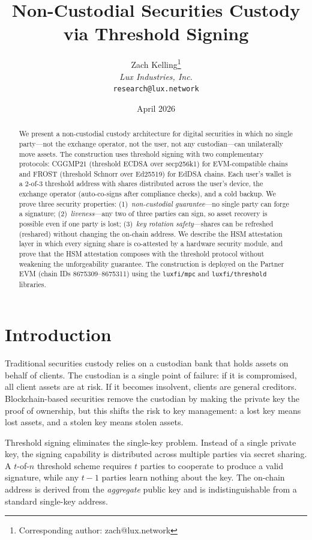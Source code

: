 \documentclass[11pt,a4paper]{article}
\title{Non-Custodial Securities Custody\\via Threshold Signing}
\author{
Zach Kelling\thanks{Corresponding author: zach@lux.network}\\
\textit{Lux Industries, Inc.}\\
\texttt{research@lux.network}
}
\date{April 2026}
\begin{document}
\luxcoverpage

\begin{abstract}
We present a non-custodial custody architecture for digital securities
in which no single party---not the exchange operator, not the user, not
any custodian---can unilaterally move assets.  The construction uses
threshold signing with two complementary protocols: CGGMP21 (threshold
ECDSA over secp256k1) for EVM-compatible chains and FROST (threshold
Schnorr over Ed25519) for EdDSA chains.  Each user's wallet is a
$2$-of-$3$ threshold address with shares distributed across the user's
device, the exchange operator (auto-co-signs after compliance checks),
and a cold backup.  We prove three security properties:
(1)~\emph{non-custodial guarantee}---no single party can forge a
signature; (2)~\emph{liveness}---any two of three parties can sign,
so asset recovery is possible even if one party is lost;
(3)~\emph{key rotation safety}---shares can be refreshed
(reshared) without changing the on-chain address.
We describe the HSM attestation layer in which every signing share
is co-attested by a hardware security module, and prove that the
HSM attestation composes with the threshold protocol without
weakening the unforgeability guarantee.  The construction is deployed
on the Partner EVM (chain IDs 8675309--8675311) using the
\texttt{luxfi/mpc} and \texttt{luxfi/threshold} libraries.
\end{abstract}

\tableofcontents
\newpage

\section{Introduction}
\label{sec:intro}

Traditional securities custody relies on a custodian bank that holds
assets on behalf of clients.  The custodian is a single point of
failure: if it is compromised, all client assets are at risk.  If it
becomes insolvent, clients are general creditors.  Blockchain-based
securities remove the custodian by making the private key the proof
of ownership, but this shifts the risk to key management: a lost key
means lost assets, and a stolen key means stolen assets.

Threshold signing eliminates the single-key problem.  Instead of a
single private key, the signing capability is distributed across
multiple parties via secret sharing.  A $t$-of-$n$ threshold scheme
requires $t$ parties to cooperate to produce a valid signature, while
any $t-1$ parties learn nothing about the key.  The on-chain address
is derived from the \emph{aggregate} public key and is
indistinguishable from a standard single-key address.
\end{document}
